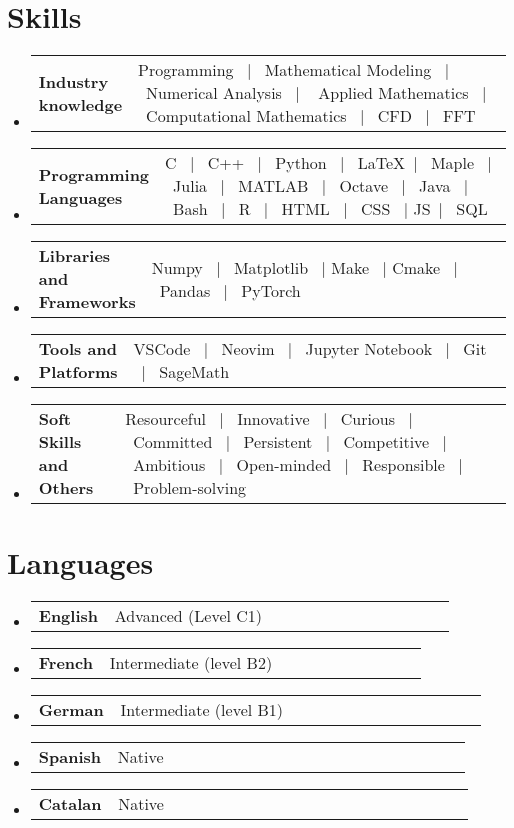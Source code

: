 \documentclass[a4paper,11pt]{article}
\makeatletter
\newcommand{\resumeSectionTypeOne}[2]{
  \item\begin{tabular*}{0.99\textwidth}[t]{
    p{0.18\linewidth}p{0.81\linewidth}
  }
  \textbf{#1} & #2
  \end{tabular*}\vspace{-2pt}
}
\newcommand{\resumeQuadHeading}[4]{
  \item
  \begin{tabular*}{0.96\textwidth}[t]{l@{\extracolsep{\fill}}r}
    \textbf{#1} & \small #2 \\
    \small#3 & \small #4 \\
  \end{tabular*}
}
\newcommand{\resumeHeadingListStart}{
  \begin{itemize}[leftmargin=0.15in, label={}]
}
\newcommand{\resumeHeadingListEnd}{\end{itemize}}
\makeatother
\begin{document}
\begin{itemize}[leftmargin=3em, itemsep=0.1em, topsep=2pt]



\section{Skills}
\resumeHeadingListStart{}
\resumeSectionTypeOne{Industry\hspace{1cm} knowledge}{Programming \ $|$ \ Mathematical Modeling \ $|$ \ Numerical Analysis \ $|$ \ \hspace{2cm} Applied Mathematics \ $|$ \ Computational Mathematics  \ $|$ \ CFD \ $|$ \ FFT}
\resumeHeadingListEnd{}

\resumeHeadingListStart{}
\resumeSectionTypeOne{Programming Languages}{C \ $|$ \ C++ \ $|$ \ Python \ $|$ \ \LaTeX \ $|$ \ Maple \ $|$ \ Julia \ $|$ \ MATLAB \ $|$ \ Octave \ $|$ \ Java \ $|$ \ Bash \qquad\ $|$ \ R \ $|$ \ HTML \ $|$ \ CSS \ $|$ JS\ $|$ \ SQL}
\resumeHeadingListEnd{}

\resumeHeadingListStart{}
\resumeSectionTypeOne{Libraries and Frameworks}{Numpy \ $|$ \ Matplotlib \ $|$ Make \ $|$ Cmake \ $|$  \ Pandas \ $|$ \ PyTorch}
\resumeHeadingListEnd{}

\resumeHeadingListStart{}
\resumeSectionTypeOne{Tools and\hspace{0.5cm} Platforms}{VSCode \ $|$ \ Neovim  \ $|$ \ Jupyter Notebook \ $|$ \ Git \ $|$ \ SageMath}
\resumeHeadingListEnd{}

\resumeHeadingListStart{}
\resumeSectionTypeOne{Soft Skills and Others}{Resourceful \ $|$ \ Innovative \ $|$ \ Curious \ $|$ \ Committed \ $|$ \ Persistent \ $|$ \ Competitive \qquad\ $|$ \ Ambitious \ $|$ \ Open-minded \ $|$ \ Responsible \ $|$ \ Problem-solving}
\resumeHeadingListEnd{}

\section{Languages}
\resumeHeadingListStart{}
\resumeSectionTypeOne{English}{Advanced (Level C1)}
\resumeSectionTypeOne{French}{Intermediate (level B2)}
\resumeSectionTypeOne{German}{Intermediate (level B1)}
\resumeSectionTypeOne{Spanish}{Native}
\resumeSectionTypeOne{Catalan}{Native}
\resumeHeadingListEnd{}


\end{itemize}
\end{document}
